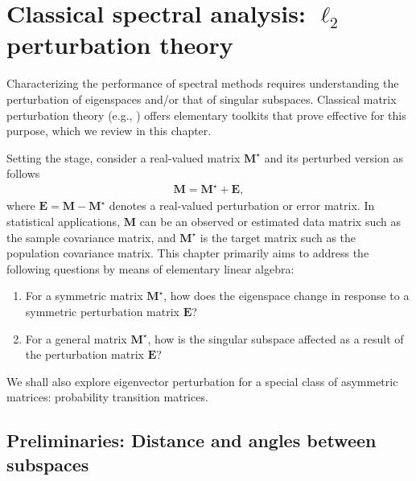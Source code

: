 \chapter[Classical spectral analysis: $\ell_2$ perturbation theory]{Classical spectral analysis: $\ell_2$ perturbation theory}
\label{cha:matrix-perturbation}


Characterizing the performance of spectral methods requires understanding the perturbation of eigenspaces and/or that of singular subspaces.
Classical matrix perturbation theory (e.g., \citet{stewart1990matrix}) offers elementary toolkits that prove effective for this purpose, which we review in this chapter.




Setting the stage, consider a real-valued matrix $\bm{M}^{\star}$ and its perturbed version as follows
%
\begin{align}
	\bm{M} = \bm{M}^{\star} + \bm{E},
	\label{eq:perturbed-M}
\end{align}
%
where $\bm{E} = 	\bm{M} -  \bm{M}^{\star}$ denotes a real-valued perturbation or error matrix. In statistical applications, $\bm{M}$ can be an observed or estimated data matrix such as the sample covariance matrix, and $\bm{M}^{\star}$ is the target matrix such as the population covariance matrix.  This chapter primarily aims to address the following questions by means of elementary linear algebra:
%
\begin{enumerate}

	\item For a symmetric matrix $\bm{M}^{\star}$, how does the eigenspace change in response to a symmetric perturbation matrix $ \bm{E}$?
	\item For a general matrix $\bm{M}^{\star}$, how is the singular subspace affected as a result of the perturbation matrix $ \bm{E}$?
\end{enumerate}
%
We shall also explore eigenvector perturbation for a special class of asymmetric matrices: probability transition matrices.












\section{Preliminaries: Distance and angles between subspaces}
\label{sec:preliminary-distance-angles}

